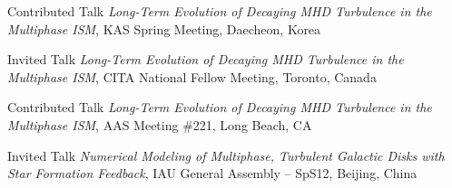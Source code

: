 \documentclass[12pt]{article}
\begin{document}
{Contributed Talk}
{\emph{Long-Term Evolution of Decaying MHD Turbulence in the Multiphase ISM},
KAS Spring Meeting,
Daecheon, Korea}

{Invited Talk}
{\emph{Long-Term Evolution of Decaying MHD Turbulence in the Multiphase ISM},
CITA National Fellow Meeting,
Toronto, Canada}

{Contributed Talk}
{\emph{Long-Term Evolution of Decaying MHD Turbulence in the Multiphase ISM},
AAS Meeting \#221,
Long Beach, CA}

{Invited Talk}
{\emph{Numerical Modeling of Multiphase, Turbulent Galactic Disks with Star Formation Feedback},
IAU General Assembly -- SpS12,
Beijing, China}
\end{document}

